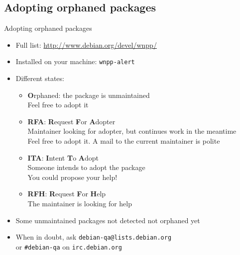 \documentclass[10pt,final]{beamer}
\begin{document}
\subsection{Adopting orphaned packages}
\begin{frame}{Adopting orphaned packages}
  \begin{itemize}
  \item Full list: \url{http://www.debian.org/devel/wnpp/}
    \hbr
  \item Installed on your machine: \texttt{wnpp-alert}
    \hbr
  \item Different states:
    \begin{itemize}
    \item \textbf{O}rphaned: the package is unmaintained\\
      Feel free to adopt it
    \item \textbf{RFA}: \textbf{R}equest \textbf{F}or \textbf{A}dopter\\
      Maintainer looking for adopter, but continues work in the meantime\\
      Feel free to adopt it. A mail to the current maintainer is polite
    \item \textbf{ITA}: \textbf{I}ntent \textbf{T}o \textbf{A}dopt\\
      Someone intends to adopt the package\\
      You could propose your help!
    \item \textbf{RFH}: \textbf{R}equest \textbf{F}or \textbf{H}elp\\
      The maintainer is looking for help
    \end{itemize}
    \hbr
  \item Some unmaintained packages not detected \arr not orphaned yet
    \hbr
  \item When in doubt, ask \texttt{debian-qa@lists.debian.org} \\
    or \texttt{\#debian-qa} on \texttt{irc.debian.org}
  \end{itemize}
\end{frame}
\end{document}
